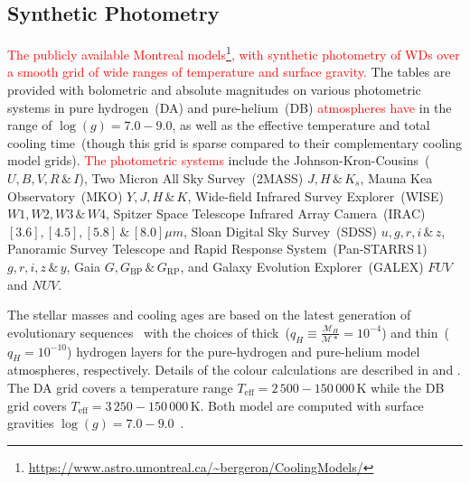 \documentclass[fleqn,usenatbib]{rasti}
\begin{document}
\subsection*{Synthetic Photometry}
\textcolor{red}{The publicly available Montreal models\footnote{\url{https://www.astro.umontreal.ca/~bergeron/CoolingModels/}},
with synthetic photometry of WDs over a smooth grid of wide ranges of temperature
and surface gravity.} The tables are provided with bolometric and absolute magnitudes
on various photometric systems in pure hydrogen~(DA) and pure-helium~(DB) \textcolor{red}{atmospheres have} in the
range of $\log(g)=7.0 - 9.0$, as well as the effective temperature and total
cooling time~(though this grid is sparse compared to their complementary cooling
model grids). \textcolor{red}{The photometric systems} include the Johnson-Kron-Cousins~($U, B, V, R\,\&\,I$),
Two Micron All Sky Survey~(2MASS) $J, H\,\&\,K_{s}$, Mauna Kea Observatory~(MKO)
$Y, J, H\,\&\,K$, Wide-field Infrared Survey Explorer~(WISE) $W1, W2, W3\,\&\,W4$,
Spitzer Space Telescope Infrared Array Camera~(IRAC)
$[3.6], [4.5], [5.8]\,\&\,[8.0] \mu m$, Sloan Digital Sky Survey~(SDSS)
$u, g, r, i\,\&\,z$, Panoramic Survey Telescope and Rapid Response
System~(Pan-STARRS\,1) $g, r, i, z\,\&\,y$,
Gaia $G, G_{\mathrm{BP}}\,\&\,G_{\mathrm{RP}}$, and Galaxy Evolution
Explorer~(GALEX) $FUV$ and $NUV$.

The stellar masses and cooling ages are based on the latest generation of
evolutionary sequences~\citep{2020ApJ...901...93B} with the choices of
thick~($q_H \equiv \frac{\mathcal{M}_H}{\mathcal{M}*} = 10^{-4}$) and thin~($q_H = 10^{-10}$)
hydrogen layers for the pure-hydrogen and pure-helium model atmospheres,
respectively. Details of the colour calculations are described in
\citet{1995PASP..107.1047B} and \citet{2006AJ....132.1221H}. The DA grid covers
a temperature range $T_{\mathrm{eff}} = 2\,500 - 150\,000$\,K while the DB grid
covers $T_{\mathrm{eff}} = 3\,250 - 150\,000$\,K. Both model are computed with
surface gravities $\log(g) = 7.0 - 9.0$~\citep{2018ApJ...863..184B,
2020ApJ...901...93B, 2011ApJ...730..128T, 2011ApJ...737...28B,
2006ApJ...651L.137K}.
\end{document}
